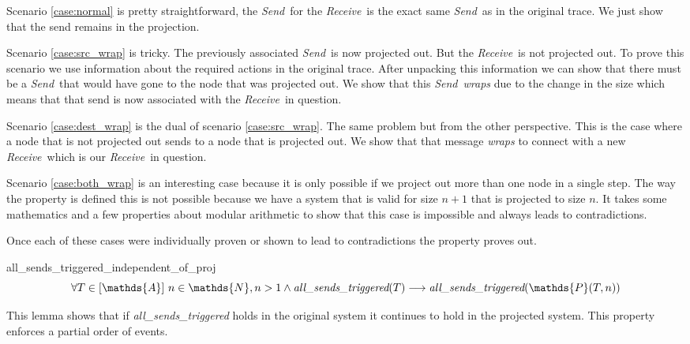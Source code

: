 \documentclass[runningheads]{llncs}
\newcommand{\send}{\emph{Send}}
\newcommand{\receive}{\emph{Receive}}
\newcommand{\action}{\mathds{A}}
\newcommand{\listaction}{[\action]}
\newcommand{\projectsize}[2]{\mathds{P}(#1, #2)}
\newcommand{\allst}[1]{\emph{all\_sends\_triggered}(#1)}
\begin{document}
Scenario \ref{case:normal} is pretty straightforward, the \send\ for the \receive\ is the exact same \send\ as in the original trace. We just show that the send remains in the projection.

Scenario \ref{case:src_wrap} is tricky. The previously associated \send\ is now projected out. But the \receive\ is not projected out. To prove this scenario we use information about the required actions in the original trace. After unpacking this information we can show that there must be a \send\ that would have gone to the node that was projected out. We show that this \send\ \emph{wraps} due to the change in the size which means that that send is now associated with the \receive\ in question.

Scenario \ref{case:dest_wrap} is the dual of scenario \ref{case:src_wrap}. The same problem but from the other perspective. This is the case where a node that is not projected out sends to a node that is projected out. We show that that message \emph{wraps} to connect with a new \receive\ which is our \receive\ in question. 

Scenario \ref{case:both_wrap} is an interesting case because it is only possible if we project out more than one node in a single step. The way the property is defined this is not possible because we have a system that is valid for size $n+1$ that is projected to size $n$. It takes some mathematics and a few properties about modular arithmetic to show that this case is impossible and always leads to contradictions.


Once each of these cases were individually proven or shown to lead to contradictions the property proves out.

\begin{lemma}{all\_sends\_triggered\_independent\_of\_proj}
$$ \forall T \in \listaction\ n \in \mathds{N}, n > 1 \wedge \allst{T} \longrightarrow \allst{\projectsize{T}{n}} $$
\end{lemma}
This lemma shows that if \emph{all\_sends\_triggered} holds in the original system it continues to hold in the projected system. This property enforces a partial order of events.
\end{document}
